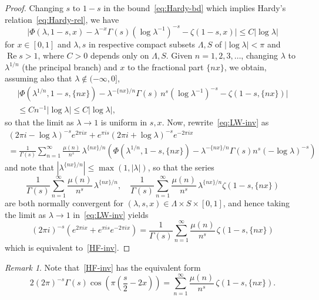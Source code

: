 \documentclass[11pt,a4paper,reqno]{amsart}
\renewcommand{\Re}{\operatorname{Re}}
\theoremstyle{plain}
\theoremstyle{remark}
\newtheorem{remark}{Remark}
\numberwithin{equation}{section}
\begin{document}
\begin{proof}
Changing $s$ to $1-s$ in the bound~\eqref{eq:Hardy-bd} which implies Hardy's relation~\eqref{eq:Hardy-rel}, we have
\[
	\big|\Phi(\lambda,1-s,x) - \lambda^{-x}\Gamma(s){(\log \lambda^{-1})}^{-s} - \zeta(1-s,x)\big| \leq C |\log\lambda|
\]
for $x \in [0,1]$ and $\lambda,s$ in respective compact subsets $\Lambda,S$ of $|\log\lambda|<\pi$ and $\Re s > 1$, where $C > 0$ depends only on $\Lambda,S$.
Given $n = 1,2,3,\dots$, changing $\lambda$ to $\lambda^{1/n}$ (the principal branch) and $x$ to the fractional part $\{nx\}$, we obtain, assuming also that $\lambda \notin (-\infty,0]$,
%
\begin{multline*}
	\big|\Phi(\lambda^{1/n},1-s,\{nx\}) - \lambda^{-\{nx\}/n}\Gamma(s) \, n^{s} {(\log \lambda^{-1})}^{-s} - \zeta(1-s,\{nx\})\big|
	\\ 
	\leq C n^{-1} |\log\lambda|
	\leq C |\log\lambda|,
\end{multline*}
%
so that the limit as $\lambda \to 1$ is uniform in $s,x$.
Now, rewrite~\eqref{eq:LW-inv} as
%
\begin{multline*}
	(2 \pi i - \log \lambda)^{-s} e^{2 \pi i x}
	  + e^{\pi i s} (2 \pi i + \log \lambda)^{-s} e^{-2 \pi i x}
	\\
	= \frac{1}{\Gamma(s)}
	  \sum_{n=1}^{\infty} \frac{\mu(n)}{n^{s}} \, \lambda^{\{nx\}/n}
	  \left(
		\Phi(\lambda^{1/n},1-s,\{nx\}) - \lambda^{-\{nx\}/n} \Gamma(s) n^{s} (-\log \lambda)^{-s}
	  \right)
\end{multline*}
%
and note that $|\lambda^{\{nx\}/n}| \leq \max(1,|\lambda|)$, so that the series 
\[
	\frac{1}{\Gamma(s)} \sum_{n=1}^{\infty} \frac{\mu(n)}{n^{s}} \, \lambda^{\{nx\}/n},
	\quad
	\frac{1}{\Gamma(s)} \sum_{n=1}^{\infty} \frac{\mu(n)}{n^{s}} \, \lambda^{\{nx\}/n} \zeta(1-s,\{nx\})
\]
are both normally convergent for $(\lambda,s,x) \in \Lambda \times S \times [0,1]$, and hence taking the limit as $\lambda \to 1$ in~\eqref{eq:LW-inv} yields
\[
	(2\pi i)^{-s} \left(e^{2\pi i x} + e^{\pi i s} e^{-2\pi i x}\right)
	= \frac{1}{\Gamma(s)} \sum_{n=1}^{\infty} \frac{\mu(n)}{n^{s}} \, \zeta(1-s,\{nx\})
\]
which is equivalent to~\eqref{HF-inv}.
\end{proof}


\begin{remark}
Note that~\eqref{HF-inv} has the equivalent form
%
\begin{equation}
\label{eq:HF-inv-cos}
	  2 (2 \pi)^{-s} \Gamma(s) \cos\left(\pi\left(\frac{s}{2} - 2 x\right)\right)
	= \sum_{n=1}^{\infty} \frac{\mu(n)}{n^{s}} \, \zeta(1-s,\{nx\}).
\end{equation}
%
\end{remark}
\end{document}
